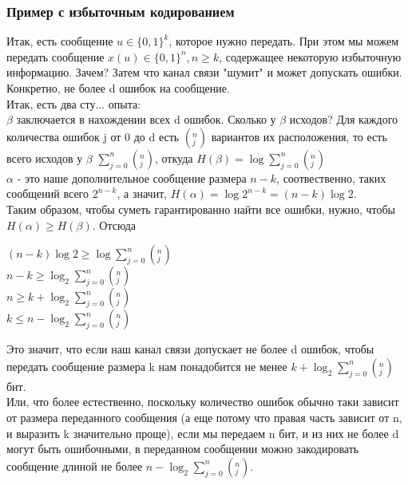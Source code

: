 \subsubsection{Пример с избыточным кодированием}
Итак, есть сообщение $u \in \{0, 1\}^k$, которое нужно передать. При этом мы можем передать сообщение $x(u) \in \{0, 1\}^n, n \geq k$, содержащее некоторую избыточную информацию. Зачем? Затем что канал связи "шумит" и может допускать ошибки. Конкретно, не более d ошибок на сообщение.\\
Итак, есть два сту... опыта: \\
$\beta$ заключается в нахождении всех d ошибок. Сколько у $\beta$ исходов? Для каждого количества ошибок j от 0 до d есть $(^n_j)$ вариантов их расположения, то есть всего исходов у $\beta$ $\sum\limits_{j = 0}^n (^n_j)$, откуда $H(\beta) = \log \sum\limits_{j = 0}^n (^n_j)$\\
$\alpha$ - это наше дополнительное сообщение размера $n - k$, соотвественно, таких сообщений всего $2^{n - k}$, а значит, $H(\alpha) = \log 2^{n - k} = (n - k) \log 2$.\\
Таким образом, чтобы суметь гарантированно найти все ошибки, нужно, чтобы $H(\alpha) \geq H(\beta)$. Отсюда\\
\begin{center}
$(n - k) \log 2 \geq \log \sum\limits_{j = 0}^n (^n_j)$\\
$n - k \geq \log_2 \sum\limits_{j = 0}^n (^n_j)$\\
$n \geq k + \log_2 \sum\limits_{j = 0}^n (^n_j)$\\
$k \leq n - \log_2 \sum\limits_{j = 0}^n (^n_j)$\\
\end{center}
Это значит, что если наш канал связи допускает не более d ошибок, чтобы передать сообщение размера k нам понадобится не менее $k + \log_2 \sum\limits_{j = 0}^n (^n_j)$ бит.\\
Или, что более естественно, поскольку количество ошибок обычно таки зависит от размера переданного сообщения (а еще потому что правая часть зависит от n, и выразить k значительно проще), если мы передаем n бит, и из них не более d могут быть ошибочными, в переданном сообщении можно закодировать сообщение длиной не более $n - \log_2 \sum\limits_{j = 0}^n (^n_j)$.

